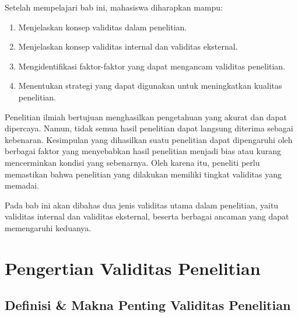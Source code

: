 \documentclass[
  indonesian,
  letterpaper,
  DIV=11,
  numbers=noendperiod]{scrreprt}
\providecommand{\tightlist}{%
  \setlength{\itemsep}{0pt}\setlength{\parskip}{0pt}}
\begin{document}
\begin{tcolorbox}[enhanced jigsaw, colframe=quarto-callout-note-color-frame, toptitle=1mm, breakable, leftrule=.75mm, arc=.35mm, toprule=.15mm, colback=white, colbacktitle=quarto-callout-note-color!10!white, bottomtitle=1mm, bottomrule=.15mm, titlerule=0mm, title=\textcolor{quarto-callout-note-color}{\faInfo}\hspace{0.5em}{Capaian Pembelajaran}, coltitle=black, left=2mm, opacitybacktitle=0.6, opacityback=0, rightrule=.15mm]

Setelah mempelajari bab ini, mahasiswa diharapkan mampu:

\begin{enumerate}
\def\labelenumi{\arabic{enumi}.}
\tightlist
\item
  Menjelaskan konsep validitas dalam penelitian.
\item
  Menjelaskan konsep validitas internal dan validitas eksternal.
\item
  Mengidentifikasi faktor-faktor yang dapat mengancam validitas
  penelitian.
\item
  Menentukan strategi yang dapat digunakan untuk meningkatkan kualitas
  penelitian.
\end{enumerate}

\end{tcolorbox}

Penelitian ilmiah bertujuan menghasilkan pengetahuan yang akurat dan
dapat dipercaya. Namun, tidak semua hasil penelitian dapat langsung
diterima sebagai kebenaran. Kesimpulan yang dihasilkan suatu penelitian
dapat dipengaruhi oleh berbagai faktor yang menyebabkan hasil penelitian
menjadi bias atau kurang mencerminkan kondisi yang sebenarnya. Oleh
karena itu, peneliti perlu memastikan bahwa penelitian yang dilakukan
memiliki tingkat validitas yang memadai.

Pada bab ini akan dibahas dua jenis validitas utama dalam penelitian,
yaitu validitas internal dan validitas eksternal, beserta berbagai
ancaman yang dapat memengaruhi keduanya.

\section{Pengertian Validitas
Penelitian}\label{pengertian-validitas-penelitian}

\subsection{Definisi \& Makna Penting Validitas
Penelitian}\label{definisi-makna-penting-validitas-penelitian}
\end{document}
